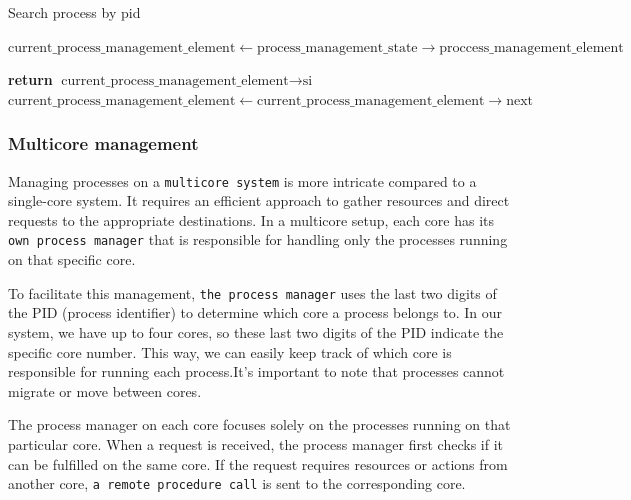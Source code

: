\begin{algorithm}
\caption{Search process by pid}
\begin{algorithmic}[1]


\State {}
\State $\text{current\_process\_management\_element} \gets \text{process\_management\_state}\rightarrow \text{proccess\_management\_element}$


        \State {}
        \State \textbf{return} $\text{current\_process\_management\_element}\rightarrow \text{si}$
    \EndIf
    \State $\text{current\_process\_management\_element} \gets \text{current\_process\_management\_element}\rightarrow \text{next}$
\EndWhile


\State {}
\EndProcedure

\end{algorithmic}
\end{algorithm}

\subsubsection{Multicore management}

Managing processes on a \texttt{multicore system} is more intricate compared to a single-core system. It requires an efficient approach to gather resources and direct requests to the appropriate destinations. In a multicore setup, each core has its \texttt{own process manager} that is responsible for handling only the processes running on that specific core.

To facilitate this management, \texttt{the process manager} uses the last two digits of the PID (process identifier) to determine which core a process belongs to. In our system, we have up to four cores, so these last two digits of the PID indicate the specific core number. This way, we can easily keep track of which core is responsible for running each process.It's important to note that processes cannot migrate or move between cores.

The process manager on each core focuses solely on the processes running on that particular core. When a request is received, the process manager first checks if it can be fulfilled on the same core. If the request requires resources or actions from another core, \texttt{a remote procedure call} is sent to the corresponding core.

